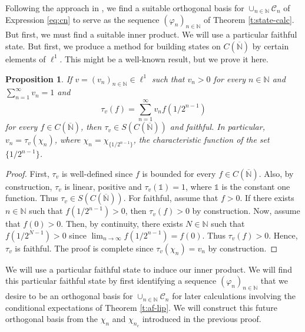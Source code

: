 \documentclass[]{amsart}
\newcommand{\overn}{\overline{\N}}
\newcommand{\vhi}{{\varphi}}
\newcommand{\N}{{\mathds{N}}}
\newcommand{\cc}{{\mathcal{C}}}
\theoremstyle{plain}
\newtheorem{proposition}[theorem]{Proposition}
\theoremstyle{definition}
\theoremstyle{remark}
\numberwithin{equation}{section}
\begin{document}
Following the approach in \cite[Section 7]{Aguilar-Latremoliere15}, we find a suitable orthogonal basis for $\cup_{n \in \N} \cc_n$ of Expression \eqref{eq:cn} to serve as the sequence $(\vhi_n)_{n \in \N}$ of Theorem \ref{t:state-calc}. But first, we must find a suitable inner product. We will use a particular faithful state. But first, we produce a method for building   states on $C(\overn)$ by certain elements of $\ell^1$. This might be a well-known result, but we prove it here.
\begin{proposition}\label{p:tracial-state}
    If   $v=(v_n)_{n \in \N} \in \ell^1$ such that $v_n > 0$ for every $n \in \N$ and $\sum_{n=1}^\infty v_n=1$ and 
    \[
    \tau_v(f)=\sum_{n=1}^\infty v_nf(1/2^{n-1})
    \]
    for every $f \in C(\overn)$, then $\tau_v \in S(C(\overn))$ and faithful. In particular, $v_n=\tau_v(\chi_n)$, where $\chi_n=\chi_{\{1/2^{n-1}\}}$, the characteristic function of the set $\{1/2^{n-1}\}$.  
\end{proposition}
\begin{proof}
First, $\tau_v$ is well-defined since $f$ is bounded for every $f \in C(\overn)$. Also, by construction, $\tau_v$ is linear, positive  and $\tau_v(\mathds{1})=1$, where $\mathds{1}$ is the constant one function. Thus $\tau_v \in S(C(\overn))$.  For faithful, assume that $f>0$. If there exists $n \in \N$ such that $f(1/2^{n-1})>0$, then $\tau_v(f)>0$ by construction. Now, assume that $f(0)>0$. Then, by continuity, there exists $N \in \N$ such that $f(1/2^{N-1})>0$ since $\lim_{n\to \infty} f(1/2^{n-1})=f(0)$.  Thus $\tau_v(f)>0.$ Hence, $\tau_v $ is faithful. The proof is complete since $\tau_v(\chi_n)=v_n$ by construction.
\end{proof}
    
 We will use a particular faithful state to induce our inner product. We will find this particular faithful state by first identifying a sequence $(\vhi_n)_{n \in \N}$ that we desire to be an orthogonal basis for $\cup_{n \in \N} \cc_n$ for later calculations involving the conditional expectations of Theorem \ref{t:af-lip}. We will construct this future orthogonal basis from the $\chi_n$ and $\chi_{n_c}$   introduced in the previous proof. 
\end{document}
